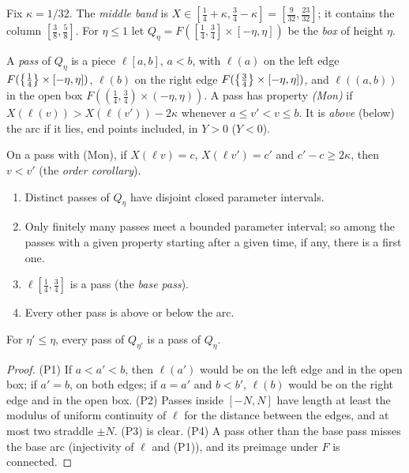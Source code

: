 Fix $\kappa=1/32$. The \emph{middle band} is $X\in[\frac14+\kappa,\frac34-\kappa]=[\frac9{32},\frac{23}{32}]$; it contains the column
$[\frac38,\frac58]$. For $\eta\le1$ let $Q_\eta=F([\frac14,\frac34]\times[-\eta,\eta])$ be the \emph{box} of height $\eta$.

\begin{definition}\label{def:pass}
A \emph{pass} of $Q_\eta$ is a piece $\ell[a,b]$, $a<b$, with $\ell(a)$ on the left edge $F(\left\{ \frac14 \right\}\times[-\eta,\eta])$, $\ell(b)$ on the right
edge $F(\left\{ \frac34 \right\}\times[-\eta,\eta])$, and $\ell((a,b))$ in the open box $F((\frac14,\frac34)\times(-\eta,\eta))$. A pass has property
\emph{(Mon)} if $X(\ell(v))>X(\ell(v'))-2\kappa$ whenever $a\le v'<v\le b$. It is \emph{above} (below) the arc if it lies, end points
included, in $Y>0$ ($Y<0$).
\end{definition}


On a pass with (Mon), if $X(\ell v)=c$, $X(\ell v')=c'$ and $c'-c\ge2\kappa$, then $v<v'$ (the \emph{order corollary}).

\begin{lemma}[Passes]\label{lem:passes}
\leavevmode
\begin{enumerate}[label=(P\arabic*)]
\item Distinct passes of $Q_\eta$ have disjoint closed parameter intervals.
\item Only finitely many passes meet a bounded parameter interval; so among the passes with a given property starting after
a given time, if any, there is a first one.
\item $\ell[\frac14,\frac34]$ is a pass (the \emph{base pass}).
\item Every other pass is above or below the arc.
\end{enumerate}
For $\eta'\le\eta$, every pass of $Q_{\eta'}$ is a pass of $Q_\eta$.
\end{lemma}

\begin{proof}
(P1) If $a<a'<b$, then $\ell(a')$ would be on the left edge and in the open box; if $a'=b$, on both edges; if $a=a'$ and $b<b'$,
$\ell(b)$ would be on the right edge and in the open box. (P2) Passes inside $[-N,N]$ have length at least the modulus of uniform
continuity of $\ell$ for the distance between the edges, and at most two straddle $\pm N$. (P3) is clear. (P4) A pass other than the
base pass misses the base arc (injectivity of $\ell$ and (P1)), and its preimage under $F$ is connected.
\end{proof}

